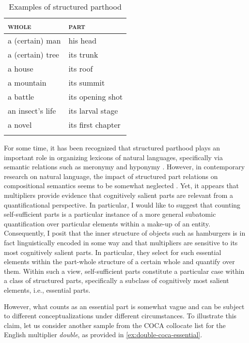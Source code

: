 \begin{table}[h!]
\centering
\begin{tabular}{ll}
\lsptoprule
\textsc{whole}   & \textsc{part}     \\ \midrule
a (certain) man  & his head          \\
a (certain) tree & its trunk         \\
a house          & its roof          \\
a mountain       & its summit        \\
a battle         & its opening shot  \\
an insect’s life & its larval stage  \\
a novel          & its first chapter \\ \lspbottomrule
\end{tabular}
\caption{Examples of structured parthood \citep[p. 10]{simons1987parts}}
\label{tab:examples-structured-parthood-simons}
\end{table}

For some time, it has been recognized that structured parthood plays an important role in organizing lexicons of natural languages, specifically via semantic relations such as meronymy and hyponymy \citep[see, e.g.,][]{cruse1986lexical}. However, in contemporary research on natural language, the impact of structured part relations on compositional semantics seems to be somewhat neglected \citep[e.g.,][]{champollion2012linguistic,champollion_krifka2016mereology}. Yet, it appears that multipliers provide evidence that cognitively salient parts are relevant from a quantificational perspective. In particular, I would like to suggest that counting self-sufficient parts is a particular instance of a more general subatomic quantification over particular elements within a make-up of an entity. Consequently, I posit that the inner structure of objects such as hamburgers is in fact linguistically encoded in some way and that multipliers are sensitive to its most cognitively salient parts. In particular, they select for such essential elements within the part-whole structure of a certain whole and quantify over them. Within such a view, self-sufficient parts constitute a particular case within a class of structured parts, specifically a subclass of cognitively most salient elements, i.e., essential parts.

However, what counts as an essential part is somewhat vague and can be subject to different conceptualizations under different circumstances. To illustrate this claim, let us consider another sample from the COCA collocate list for the English multiplier \textit{double}, as provided in \ref{ex:double-coca-essential}. 

